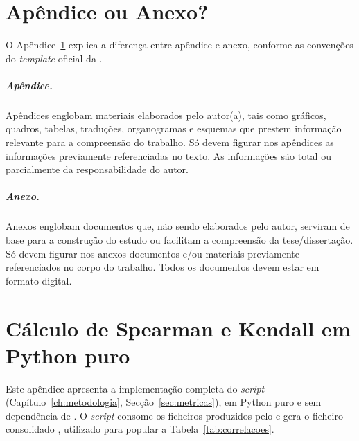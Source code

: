 \chapter{Apêndice ou Anexo?}
\label{ap:diferenca}

O Apêndice~\ref{ap:diferenca} explica a diferença entre apêndice e
anexo, conforme as convenções do \emph{template} oficial da
\thesisuniversity.

\paragraph{Apêndice.} Apêndices englobam materiais elaborados pelo
autor(a), tais como gráficos, quadros, tabelas, traduções,
organogramas e esquemas que prestem informação relevante para a
compreensão do trabalho. Só devem figurar nos apêndices as
informações previamente referenciadas no texto. As informações são
total ou parcialmente da responsabilidade do autor.

\paragraph{Anexo.} Anexos englobam documentos que, não sendo
elaborados pelo autor, serviram de base para a construção do estudo
ou facilitam a compreensão da tese/dissertação. Só devem figurar
nos anexos documentos e/ou materiais previamente referenciados no
corpo do trabalho. Todos os documentos devem estar em formato
digital.

\chapter{Cálculo de Spearman e Kendall em Python puro}
\label{ap:correlation-code}

Este apêndice apresenta a implementação completa do \emph{script}
 (Capítulo~\ref{ch:metodologia},
Secção~\ref{sec:metricas}), em Python puro e sem dependência de
. O \emph{script} consome os ficheiros
 produzidos pelo  e
gera o ficheiro consolidado ,
utilizado para popular a Tabela~\ref{tab:correlacoes}.

